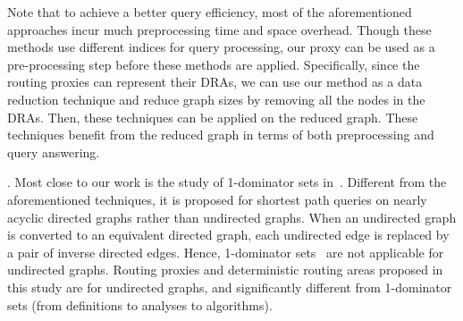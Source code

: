 Note that to achieve a better query efficiency, most of the aforementioned approaches incur much preprocessing time and space overhead. Though these methods use different indices for query processing, our proxy can be used as a pre-processing step before these methods are applied. Specifically, since the routing proxies can represent their DRAs, we can use our method as a data reduction technique and reduce graph sizes by removing all the nodes in the DRAs. Then, these techniques can be applied on the reduced graph. These techniques benefit from the reduced graph in terms of both preprocessing and query answering.


. Most close to our work is the study of 1-dominator sets in~\cite{SaundersT07}. Different from the aforementioned techniques, it is proposed for shortest path queries on nearly acyclic directed graphs rather than undirected graphs. When an undirected graph is converted to an equivalent directed graph, each undirected edge is replaced by a pair of inverse directed edges. Hence, 1-dominator sets~\cite{SaundersT07} are not applicable for undirected graphs. Routing proxies and deterministic routing areas proposed in this study  are for undirected graphs,  and  significantly different from 1-dominator sets (from definitions to analyses to algorithms).








